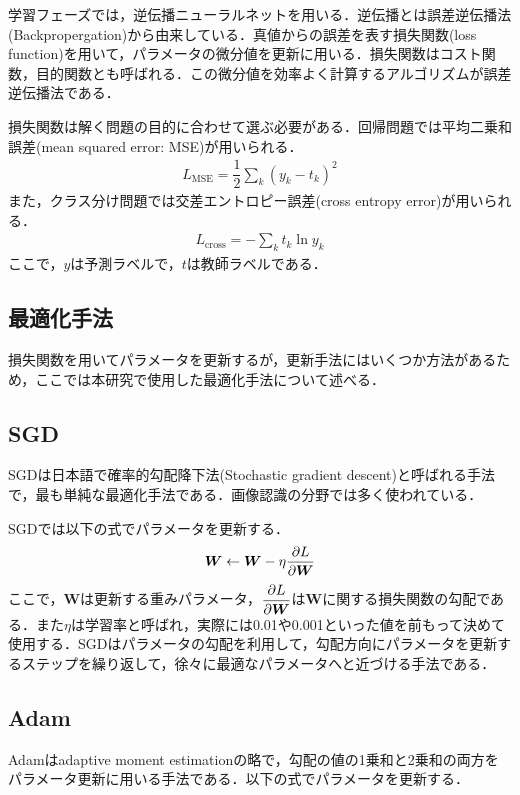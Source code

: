 学習フェーズでは，逆伝播ニューラルネットを用いる．逆伝播とは誤差逆伝播法(Backpropergation)\cite{Backprop}から由来している．真値からの誤差を表す損失関数(loss function)を用いて，パラメータの微分値を更新に用いる．損失関数はコスト関数，目的関数とも呼ばれる．この微分値を効率よく計算するアルゴリズムが誤差逆伝播法である．

損失関数は解く問題の目的に合わせて選ぶ必要がある．回帰問題では平均二乗和誤差(mean squared error: MSE)が用いられる．
\begin{align}\label{eq:mse}
	L_{\mathrm{MSE}} = \dfrac{1}{2} \sum_{k} (y_k - t_k)^2
\end{align}
また，クラス分け問題では交差エントロピー誤差(cross entropy error)が用いられる．
\begin{align}\label{eq:crossentropy}
	L_{\mathrm{cross}} = - \sum_k t_k \ln {y_k}
\end{align}
ここで，$y$は予測ラベルで，$t$は教師ラベルである．

\subsection{最適化手法}
損失関数を用いてパラメータを更新するが，更新手法にはいくつか方法があるため，ここでは本研究で使用した最適化手法について述べる．

\subsection*{SGD}
SGDは日本語で確率的勾配降下法(Stochastic gradient descent)と呼ばれる手法で，最も単純な最適化手法である．画像認識の分野では多く使われている．

SGDでは以下の式でパラメータを更新する．
\begin{align}\label{eq:SGD}
	\bm{W} \leftarrow \bm{W} - \eta \dfrac{\partial L}{\partial \bm{W}} 
\end{align}
ここで，$\bm{W}$は更新する重みパラメータ，$\dfrac{\partial L}{\partial \bm{W}}$は$\bm{W}$に関する損失関数の勾配である．また$\eta$は学習率と呼ばれ，実際には0.01や0.001といった値を前もって決めて使用する．SGDはパラメータの勾配を利用して，勾配方向にパラメータを更新するステップを繰り返して，徐々に最適なパラメータへと近づける手法である．

\subsection*{Adam}
Adam\cite{Adam}はadaptive moment estimationの略で，勾配の値の1乗和と2乗和の両方をパラメータ更新に用いる手法である．以下の式でパラメータを更新する．

